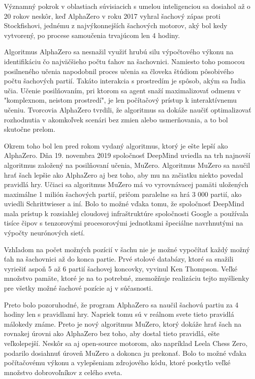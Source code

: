 \documentclass[10pt,oneside,slovak,a4paper]{article}
\begin{document}
Významný pokrok v oblastiach súvisiacich s umelou inteligenciou sa dosiahol až o 20 rokov neskôr, keď AlphaZero v roku 2017 vyhral šachový zápas proti Stockfishovi, jednému z najvýkonnejších šachových motorov, aký bol kedy vytvorený, po procese samoučenia trvajúcom len 4 hodiny.

Algoritmus AlphaZero sa nesnažil využiť hrubú silu výpočtového výkonu na identifikáciu čo najväčšieho počtu ťahov na šachovnici. Namiesto toho pomocou posilneného učenia napodobnil proces učenia sa človeka štúdiom pôsobivého počtu šachových partií. Takáto interakcia s prostredím je spôsob, akým sa ľudia učia. Učenie posilňovaním, pri ktorom sa agent snaží maximalizovať odmenu v "komplexnom, neistom prostredí", je len počítačový prístup k interaktívnemu učeniu. Tvorcovia AlphaZero tvrdili, že algoritmus sa dokáže naučiť optimalizovať rozhodnutia v akomkoľvek scenári bez zmien alebo usmerňovania, a to bol skutočne prelom.

Okrem toho bol len pred rokom vydaný algoritmus, ktorý je ešte lepší ako AlphaZero. Dňa 19. novembra 2019 spoločnosť DeepMind uviedla na trh najnovší algoritmus založený na posilňovaní učenia, MuZero. Algoritmus MuZero sa naučil hrať šach lepšie ako AlphaZero aj bez toho, aby mu na začiatku niekto povedal pravidlá hry. Učiaci sa algoritmus MuZero má vo vyrovnávacej pamäti uložených maximálne 1 milión šachových partií, pričom paralelne sa hrá 3 000 partií, ako uviedli Schrittwieser a iní. Bolo to možné vďaka tomu, že spoločnosť DeepMind mala prístup k rozsiahlej cloudovej infraštruktúre spoločnosti Google a používala tisíce čipov s tenzorovými procesorovými jednotkami špeciálne navrhnutými na výpočty neurónových sietí.

Vzhľadom na počet možných pozícií v šachu nie je možné vypočítať každý možný ťah na šachovnici až do konca partie. Prvé stolové databázy, ktoré sa snažili vyriešiť aspoň 5 až 6 partií šachovej koncovky, vyvinul Ken Thompson. Veľké množstvo pamäte, ktoré je na to potrebné, znemožňuje realizáciu tejto myšlienky pre všetky možné šachové pozície aj v súčasnosti.

Preto bolo pozoruhodné, že program AlphaZero sa naučil šachovú partiu za 4 hodiny len s pravidlami hry. Napriek tomu sú v reálnom svete tieto pravidlá málokedy známe. Preto je nový algoritmus MuZero, ktorý dokáže hrať šach na rovnakej úrovni ako AlphaZero bez toho, aby dostal tieto pravidlá, ešte veľkolepejší. Neskôr sa aj open-source motorom, ako napríklad Leela Chess Zero, podarilo dosiahnuť úroveň MuZero a dokonca ju prekonať. Bolo to možné vďaka počítačovému výkonu a vylepšeniam zdrojového kódu, ktoré poskytlo veľké množstvo dobrovoľníkov z celého sveta.
\end{document}
